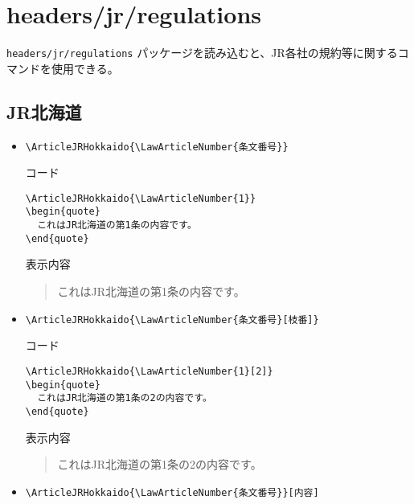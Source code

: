 \documentclass[oneside,10pt,a4paper]{jsarticle}
\begin{document}
  \section{headers/jr/regulations}

  \verb|headers/jr/regulations| パッケージを読み込むと、JR各社の規約等に関するコマンドを使用できる。

  \subsection{JR北海道}

  \begin{itemize}
    \item \verb|\ArticleJRHokkaido{\LawArticleNumber{条文番号}}|
      \begin{itembox}[l]{コード}
        {\footnotesize\begin{verbatim}
\ArticleJRHokkaido{\LawArticleNumber{1}}
\begin{quote}
  これはJR北海道の第1条の内容です。
\end{quote}\end{verbatim}}
      \end{itembox}
      \begin{itembox}[l]{表示内容}
        \begin{quote}
          これはJR北海道の第1条の内容です。
        \end{quote}
      \end{itembox}
    \item \verb|\ArticleJRHokkaido{\LawArticleNumber{条文番号}[枝番]}|
      \begin{itembox}[l]{コード}
        {\footnotesize\begin{verbatim}
\ArticleJRHokkaido{\LawArticleNumber{1}[2]}
\begin{quote}
  これはJR北海道の第1条の2の内容です。
\end{quote}\end{verbatim}}
      \end{itembox}
      \begin{itembox}[l]{表示内容}
        \begin{quote}
          これはJR北海道の第1条の2の内容です。
        \end{quote}
      \end{itembox}
    \newpage
    \item \verb|\ArticleJRHokkaido{\LawArticleNumber{条文番号}}[内容]|

\end{itemize}
\end{document}
